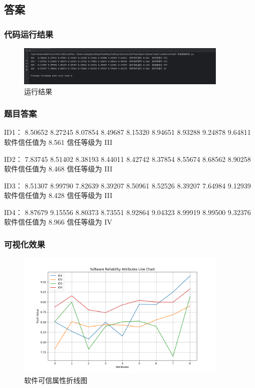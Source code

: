 \documentclass{article}
\begin{document}
\subsection{答案}

\subsubsection{代码运行结果}

\begin{figure}[H]
	\centering
	\includegraphics[width=0.9\textwidth]{img/02.png}
	\caption{运行结果}
\end{figure}

\subsubsection{题目答案}

ID1： 8.50652 8.27245 8.07854 8.49687 8.15320 8.94651 8.93288 9.24878 9.64811  软件信任值为 8.561  信任等级为 III

ID2： 7.83745 8.51402 8.38193 8.44011 8.42742 8.37854 8.55674 8.68562 8.90258  软件信任值为 8.468  信任等级为 III

ID3： 8.51307 8.99790 7.82639 8.39207 8.50961 8.52526 8.39207 7.64984 9.12939  软件信任值为 8.428  信任等级为 III

ID4： 8.87679 9.15556 8.80373 8.73551 8.92864 9.04323 8.99919 8.99500 9.32376  软件信任值为 8.966  信任等级为 IV

\subsubsection{可视化效果}

\begin{figure}[H]
	\centering
	\includegraphics[width=0.9\textwidth]{img/0201.png}
	\caption{软件可信属性折线图}
\end{figure}
\end{document}
